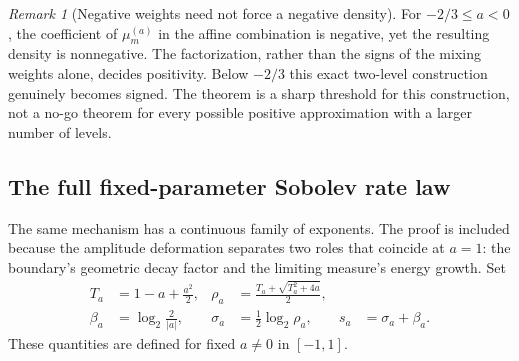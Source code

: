 \documentclass[11pt,a4paper]{article}
\numberwithin{equation}{section}
\theoremstyle{definition}
\theoremstyle{remark}
\newtheorem{remark}[theorem]{Remark}
\begin{document}
\begin{remark}[Negative weights need not force a negative density]
For $-2/3\le a<0$, the coefficient of $\mu_m^{(a)}$ in the affine combination
is negative, yet the resulting density is nonnegative. The factorization, rather
than the signs of the mixing weights alone, decides positivity. Below $-2/3$
this exact two-level construction genuinely becomes signed. The theorem is a
sharp threshold for this construction, not a no-go theorem for every possible
positive approximation with a larger number of levels.
\end{remark}

\subsection{The full fixed-parameter Sobolev rate law}
The same mechanism has a continuous family of exponents. The proof is included
because the amplitude deformation separates two roles that coincide at $a=1$:
the boundary's geometric decay factor and the limiting measure's energy growth.
Set
\begin{align}
 T_a&=1-a+\frac{a^2}{2},&
 \rho_a&=\frac{T_a+\sqrt{T_a^2+4a}}2,\label{eq:rhoa}\\
 \beta_a&=\log_2\frac2{|a|},&
 \sigma_a&=\frac12\log_2\rho_a,& s_a&=\sigma_a+\beta_a.
 \label{eq:param-exponents}
\end{align}
These quantities are defined for fixed $a\ne0$ in $[-1,1]$.
\end{document}
